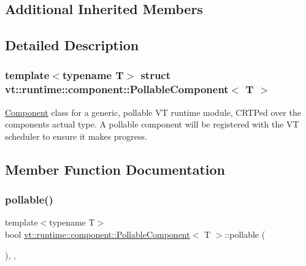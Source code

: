 \subsection*{Additional Inherited Members}


\subsection{Detailed Description}
\subsubsection*{template$<$typename T$>$\newline
struct vt\+::runtime\+::component\+::\+Pollable\+Component$<$ T $>$}

{\ttfamily \hyperlink{structvt_1_1runtime_1_1component_1_1_component}{Component}} class for a generic, pollable VT runtime module, C\+R\+TP\textquotesingle{}ed over the component\textquotesingle{}s actual type. A pollable component will be registered with the VT scheduler to ensure it makes progress. 

\subsection{Member Function Documentation}
\mbox{\label{structvt_1_1runtime_1_1component_1_1_pollable_component_a8ad6cfbc184ed9862cae5304605fe025}} 
\subsubsection{\texorpdfstring{pollable()}{pollable()}}
{\footnotesize\ttfamily template$<$typename T$>$ \\
bool \hyperlink{structvt_1_1runtime_1_1component_1_1_pollable_component}{vt\+::runtime\+::component\+::\+Pollable\+Component}$<$ T $>$\+::pollable (\begin{DoxyParamCaption}{ }\end{DoxyParamCaption})\hspace{0.3cm}{\ttfamily [inline]}, {\ttfamily [override]}, {\ttfamily [virtual]}}



